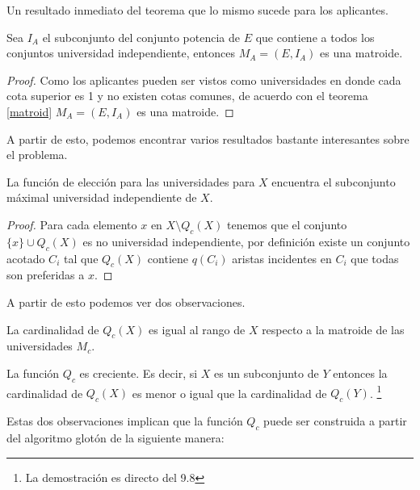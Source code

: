 Un resultado inmediato del teorema que lo mismo sucede para los aplicantes. 

\begin{cor}
Sea $I_A$ el subconjunto del conjunto potencia de $E$ que contiene a todos los conjuntos universidad independiente, entonces $M_A = (E,I_A)$ es una matroide. 
\end{cor}
\begin{proof}
Como los aplicantes pueden ser vistos como universidades en donde cada cota superior es 1 y no existen cotas comunes, de acuerdo con el teorema \ref{matroid} $M_A = (E,I_A)$ es una matroide. 
\end{proof}

A partir de esto, podemos encontrar varios resultados bastante interesantes sobre el problema. 

\begin{cor}
La función de elección para las universidades para $X$ encuentra el subconjunto máximal universidad independiente de $X$.
\end{cor}

\begin{proof}
Para cada elemento $x$ en $X\setminus Q_c(X)$ tenemos que el conjunto $\{x\}\cup Q_c(X)$ es no universidad independiente, por definición existe un conjunto acotado $C_i$ tal que $Q_c(X)$ contiene $q(C_i)$ aristas incidentes en $C_i$ que todas son preferidas a $x$.
\end{proof}

A partir de esto podemos ver dos observaciones.

\begin{obs}
La cardinalidad de $Q_c(X)$ es igual al rango de $X$ respecto a la matroide de las universidades $M_c$. 
\end{obs}

\begin{obs}
La función $Q_c$ es creciente. Es decir, si $X$ es un subconjunto de $Y$ entonces la cardinalidad de $Q_c(X)$ es menor o igual que la cardinalidad de $Q_c(Y)$. \footnote{La demostración es directo del 9.8 } %
\end{obs} 

Estas dos observaciones implican que la función $Q_c$ puede ser construida a partir del algoritmo glotón de la siguiente manera:

